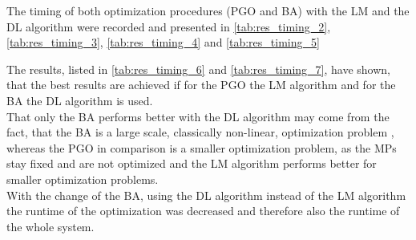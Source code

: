The timing of both optimization procedures (\ac{PGO} and \ac{BA}) with the \ac{LM} and the \ac{DL} algorithm were recorded and presented in \autoref{tab:res_timing_2}, \autoref{tab:res_timing_3}, \autoref{tab:res_timing_4} and \autoref{tab:res_timing_5}

The results, listed in \autoref{tab:res_timing_6} and \autoref{tab:res_timing_7}, have shown, that the best results are achieved if for the \ac{PGO} the \ac{LM} algorithm and for the \ac{BA} the \ac{DL} algorithm is used.\\

That only the \ac{BA} performs better with the \ac{DL} algorithm may come from the fact, that the \ac{BA} is a large scale, classically non-linear, optimization problem \cite{Lourakis2005, Triggs2000}, whereas the \ac{PGO} in comparison is a smaller optimization problem, as the \acp{MP} stay fixed and are not optimized and the \ac{LM} algorithm performs better for smaller optimization problems.\\

With the change of the \ac{BA}, using the \ac{DL} algorithm instead of the \ac{LM} algorithm the runtime of the optimization was decreased and therefore also the runtime of the whole system.

